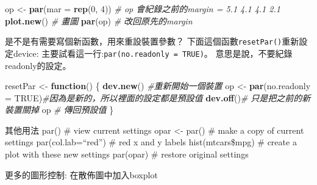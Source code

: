 \documentclass[]{book}
\newenvironment{Shaded}{\begin{snugshade}}{\end{snugshade}}
\newcommand{\CommentTok}[1]{\textcolor[rgb]{0.56,0.35,0.01}{\textit{#1}}}
\newcommand{\ControlFlowTok}[1]{\textcolor[rgb]{0.13,0.29,0.53}{\textbf{#1}}}
\newcommand{\DataTypeTok}[1]{\textcolor[rgb]{0.13,0.29,0.53}{#1}}
\newcommand{\DecValTok}[1]{\textcolor[rgb]{0.00,0.00,0.81}{#1}}
\newcommand{\KeywordTok}[1]{\textcolor[rgb]{0.13,0.29,0.53}{\textbf{#1}}}
\newcommand{\NormalTok}[1]{#1}
\newcommand{\OtherTok}[1]{\textcolor[rgb]{0.56,0.35,0.01}{#1}}
\newcommand{\StringTok}[1]{\textcolor[rgb]{0.31,0.60,0.02}{#1}}
\theoremstyle{definition}
\theoremstyle{definition}
\theoremstyle{definition}
\theoremstyle{remark}
\begin{document}
\begin{Shaded}
\begin{Highlighting}[]
\NormalTok{op <-}\StringTok{ }\KeywordTok{par}\NormalTok{(}\DataTypeTok{mar =} \KeywordTok{rep}\NormalTok{(}\DecValTok{0}\NormalTok{, }\DecValTok{4}\NormalTok{))   }\CommentTok{# op 會紀錄之前的margin = 5.1 4.1 4.1 2.1  }
\KeywordTok{plot.new}\NormalTok{() }\CommentTok{# 畫圖   }
\KeywordTok{par}\NormalTok{(op) }\CommentTok{# 改回原先的margin  }
\end{Highlighting}
\end{Shaded}

是不是有需要寫個新函數，用來重設裝置參數？
下面這個函數\texttt{resetPar()}重新設定device:
主要試看這一行:\texttt{par(no.readonly\ =\ TRUE)}。 意思是說，不要紀錄
readonly的設定。

\begin{Shaded}
\begin{Highlighting}[]
\NormalTok{resetPar <-}\StringTok{ }\ControlFlowTok{function}\NormalTok{() \{}
    \KeywordTok{dev.new}\NormalTok{() }\CommentTok{#重新開始一個裝置}
\NormalTok{    op <-}\StringTok{ }\KeywordTok{par}\NormalTok{(}\DataTypeTok{no.readonly =} \OtherTok{TRUE}\NormalTok{)}\CommentTok{#因為是新的，所以裡面的設定都是預設值}
    \KeywordTok{dev.off}\NormalTok{()}\CommentTok{# 只是把之前的新裝置關掉}
\NormalTok{    op }\CommentTok{# 傳回預設值}
\NormalTok{\}}
\end{Highlighting}
\end{Shaded}

其他用法 par() \# view current settings opar \textless{}- par() \# make
a copy of current settings par(col.lab=``red'') \# red x and y labels
hist(mtcars\$mpg) \# create a plot with these new settings par(opar) \#
restore original settings

更多的圖形控制: 在散佈圖中加入boxplot
\end{document}
